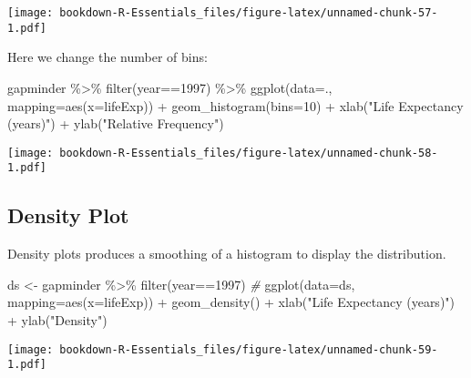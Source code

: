 \documentclass[
]{book}
\newenvironment{Shaded}{\begin{snugshade}}{\end{snugshade}}
\newcommand{\AttributeTok}[1]{\textcolor[rgb]{0.77,0.63,0.00}{#1}}
\newcommand{\CommentTok}[1]{\textcolor[rgb]{0.56,0.35,0.01}{\textit{#1}}}
\newcommand{\DecValTok}[1]{\textcolor[rgb]{0.00,0.00,0.81}{#1}}
\newcommand{\FunctionTok}[1]{\textcolor[rgb]{0.00,0.00,0.00}{#1}}
\newcommand{\NormalTok}[1]{#1}
\newcommand{\OtherTok}[1]{\textcolor[rgb]{0.56,0.35,0.01}{#1}}
\newcommand{\SpecialCharTok}[1]{\textcolor[rgb]{0.00,0.00,0.00}{#1}}
\newcommand{\StringTok}[1]{\textcolor[rgb]{0.31,0.60,0.02}{#1}}
\begin{document}
\texttt{[image: bookdown-R-Essentials\_files/figure-latex/unnamed-chunk-57-1.pdf]}

Here we change the number of bins:

\begin{Shaded}
\begin{Highlighting}[]
\NormalTok{gapminder }\SpecialCharTok{\%\textgreater{}\%} 
  \FunctionTok{filter}\NormalTok{(year}\SpecialCharTok{==}\DecValTok{1997}\NormalTok{) }\SpecialCharTok{\%\textgreater{}\%}
\FunctionTok{ggplot}\NormalTok{(}\AttributeTok{data=}\NormalTok{., }\AttributeTok{mapping=}\FunctionTok{aes}\NormalTok{(}\AttributeTok{x=}\NormalTok{lifeExp)) }\SpecialCharTok{+} 
  \FunctionTok{geom\_histogram}\NormalTok{(}\AttributeTok{bins=}\DecValTok{10}\NormalTok{) }\SpecialCharTok{+} 
  \FunctionTok{xlab}\NormalTok{(}\StringTok{"Life Expectancy (years)"}\NormalTok{) }\SpecialCharTok{+}
  \FunctionTok{ylab}\NormalTok{(}\StringTok{"Relative Frequency"}\NormalTok{)}
\end{Highlighting}
\end{Shaded}

\texttt{[image: bookdown-R-Essentials\_files/figure-latex/unnamed-chunk-58-1.pdf]}

\hypertarget{density-plot}{%
\subsection{Density Plot}\label{density-plot}}

Density plots produces a smoothing of a histogram to display the distribution.

\begin{Shaded}
\begin{Highlighting}[]
\NormalTok{ds }\OtherTok{\textless{}{-}}\NormalTok{ gapminder }\SpecialCharTok{\%\textgreater{}\%} 
  \FunctionTok{filter}\NormalTok{(year}\SpecialCharTok{==}\DecValTok{1997}\NormalTok{)}
\CommentTok{\#}
\FunctionTok{ggplot}\NormalTok{(}\AttributeTok{data=}\NormalTok{ds, }\AttributeTok{mapping=}\FunctionTok{aes}\NormalTok{(}\AttributeTok{x=}\NormalTok{lifeExp)) }\SpecialCharTok{+} 
  \FunctionTok{geom\_density}\NormalTok{() }\SpecialCharTok{+} 
  \FunctionTok{xlab}\NormalTok{(}\StringTok{"Life Expectancy (years)"}\NormalTok{) }\SpecialCharTok{+}
  \FunctionTok{ylab}\NormalTok{(}\StringTok{"Density"}\NormalTok{)}
\end{Highlighting}
\end{Shaded}

\texttt{[image: bookdown-R-Essentials\_files/figure-latex/unnamed-chunk-59-1.pdf]}
\end{document}

